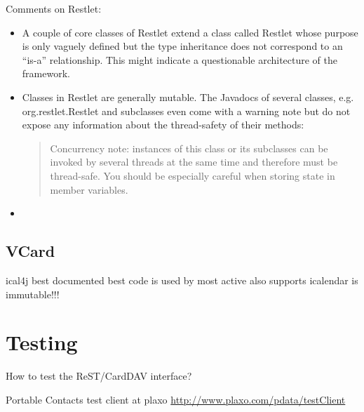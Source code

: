 \documentclass[12pt,a4paper]{scrartcl}		%
\begin{document}
Comments on Restlet:
\begin{itemize}
\item A couple of core classes of Restlet extend a class called Restlet whose
  purpose is only vaguely defined but the type inheritance does not correspond
  to an ``is-a'' relationship. This might indicate a questionable architecture
  of the framework.
\item Classes in Restlet are generally mutable. The Javadocs of several classes,
  e.g. org.restlet.Restlet and subclasses even come with a warning note but do
  not expose any information about the thread-safety of their methods:
  \begin{quote}
    Concurrency note: instances of this class or its subclasses can be invoked by several threads at the same time and therefore must be thread-safe. You should be especially careful when storing state in member variables. 
  \end{quote}
\item 
\end{itemize}

\subsection{VCard}



ical4j 
best documented
best code
is used by 
most active
also supports icalendar
is immutable!!!

\section{Testing}
How to test the ReST/CardDAV interface?

% 


Portable Contacts test client at plaxo \url{http://www.plaxo.com/pdata/testClient}
\end{document}
